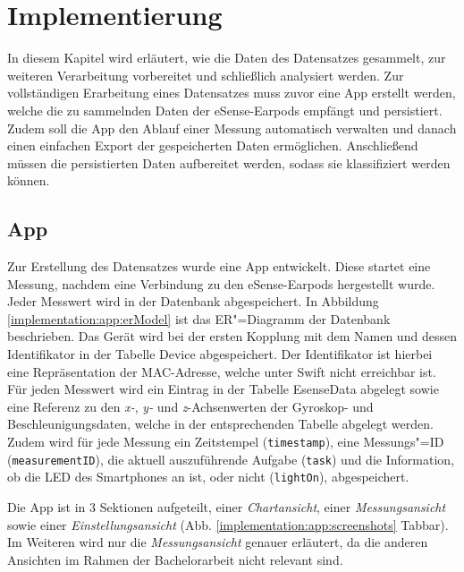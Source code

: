 \chapter{Implementierung}
\label{ch:Implementierung}

In diesem Kapitel wird erläutert, wie die Daten des Datensatzes gesammelt, zur weiteren Verarbeitung vorbereitet und schließlich analysiert werden.
Zur vollständigen Erarbeitung eines Datensatzes muss zuvor eine App erstellt werden, welche die zu sammelnden Daten der eSense-Earpods empfängt und persistiert. 
Zudem soll die App den Ablauf einer Messung automatisch verwalten und danach einen einfachen Export der gespeicherten Daten ermöglichen.
Anschließend müssen die persistierten Daten aufbereitet werden, sodass sie klassifiziert werden können.

\section{App}
\label{ch:Implementierung:app}
Zur Erstellung des Datensatzes wurde eine App entwickelt.
Diese startet eine Messung, nachdem eine Verbindung zu den eSense-Earpods hergestellt wurde.
Jeder Messwert wird in der Datenbank abgespeichert.
In Abbildung \ref{implementation:app:erModel} ist das ER"=Diagramm der Datenbank beschrieben.
Das Gerät wird bei der ersten Kopplung mit dem Namen und dessen Identifikator in der Tabelle {\glqq Device\grqq} abgespeichert.
Der Identifikator ist hierbei eine Repräsentation der MAC-Adresse, welche unter Swift nicht erreichbar ist.
Für jeden Messwert wird ein Eintrag in der Tabelle {\glqq EsenseData\grqq} abgelegt sowie eine Referenz zu den \textit{x-}, \textit{y-} und \textit{z}-Achsenwerten der Gyroskop- und Beschleunigungsdaten, welche in der entsprechenden Tabelle abgelegt werden. \\
Zudem wird für jede Messung ein Zeitstempel (\texttt{timestamp}), eine Messungs"=ID \\ 
(\texttt{measurementID}), die aktuell auszuführende Aufgabe (\texttt{task}) und die Information, ob die LED des Smartphones an ist, oder nicht (\texttt{lightOn}), abgespeichert.

Die App ist in 3 Sektionen aufgeteilt, einer \textit{Chartansicht}, einer \textit{Messungsansicht} sowie einer \textit{Einstellungsansicht} (Abb. \ref{implementation:app:screenshots} Tabbar).
Im Weiteren wird nur die \textit{Messungsansicht} genauer erläutert, da die anderen Ansichten im Rahmen der Bachelorarbeit nicht relevant sind.

